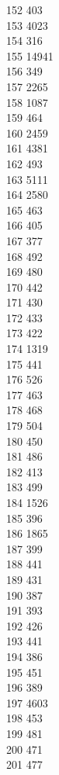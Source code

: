 { 152	403 \\
 153	4023 \\
 154	316 \\
 155	14941 \\
 156	349 \\
 157	2265 \\
 158	1087 \\
 159	464 \\
 160	2459 \\
 161	4381 \\
 162	493 \\
 163	5111 \\
 164	2580 \\
 165	463 \\
 166	405 \\
 167	377 \\
 168	492 \\
 169	480 \\
 170	442 \\
 171	430 \\
 172	433 \\
 173	422 \\
 174	1319 \\
 175	441 \\
 176	526 \\
 177	463 \\
 178	468 \\
 179	504 \\
 180	450 \\
 181	486 \\
 182	413 \\
 183	499 \\
 184	1526 \\
 185	396 \\
 186	1865 \\
 187	399 \\
 188	441 \\
 189	431 \\
 190	387 \\
 191	393 \\
 192	426 \\
 193	441 \\
 194	386 \\
 195	451 \\
 196	389 \\
 197	4603 \\
 198	453 \\
 199	481 \\
 200	471 \\
 201	477 \\
}
